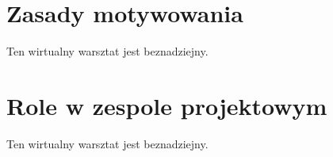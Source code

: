 
\section{Zasady motywowania}

Ten wirtualny warsztat jest beznadziejny.


\section{Role w zespole projektowym}

Ten wirtualny warsztat jest beznadziejny.


